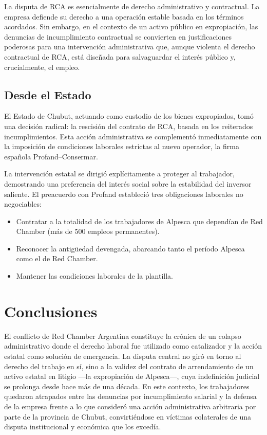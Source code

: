 \documentclass[]{informeutn}
\begin{document}
      La disputa de RCA es esencialmente de derecho administrativo y contractual. La empresa defiende su derecho a una
      operación estable basada en los términos acordados. Sin embargo, en el contexto de un activo público en
      expropiación, las denuncias de incumplimiento contractual se convierten en justificaciones poderosas para una
      intervención administrativa que, aunque violenta el derecho contractual de RCA, está diseñada para salvaguardar el
      interés público y, crucialmente, el empleo.

    \section{Desde el Estado}
      El Estado de Chubut, actuando como custodio de los bienes expropiados, tomó una decisión radical: la rescisión del
      contrato de RCA, basada en los reiterados incumplimientos. Esta acción administrativa se complementó
      inmediatamente con la imposición de condiciones laborales estrictas al nuevo operador, la firma española
      Profand–Consermar.

      La intervención estatal se dirigió explícitamente a proteger al trabajador, demostrando una preferencia del
      interés social sobre la estabilidad del inversor saliente. El preacuerdo con Profand estableció tres obligaciones
      laborales no negociables:
      \begin{itemize}
        \item Contratar a la totalidad de los trabajadores de Alpesca que dependían de Red Chamber (más de 500 empleos permanentes).
        \item Reconocer la antigüedad devengada, abarcando tanto el período Alpesca como el de Red Chamber.
        \item Mantener las condiciones laborales de la plantilla.
      \end{itemize}

  \chapter{Conclusiones}
    El conflicto de Red Chamber Argentina constituye la crónica de un colapso administrativo donde el derecho laboral
    fue utilizado como catalizador y la acción estatal como solución de emergencia. La disputa central no giró en torno
    al derecho del trabajo en sí, sino a la validez del contrato de arrendamiento de un activo estatal en litigio —la
    expropiación de Alpesca—, cuya indefinición judicial se prolonga desde hace más de una década. En este contexto, los
    trabajadores quedaron atrapados entre las denuncias por incumplimiento salarial y la defensa de la empresa frente a
    lo que consideró una acción administrativa arbitraria por parte de la provincia de Chubut, convirtiéndose en
    víctimas colaterales de una disputa institucional y económica que los excedía.
\end{document}
